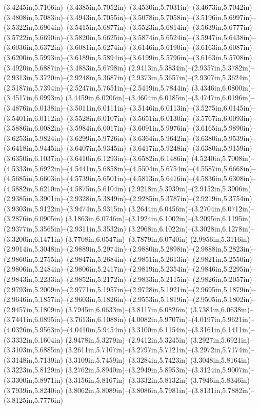 (3.4245in,5.7106in)--(3.4385in,5.7052in)--(3.4530in,5.7031in)--(3.4673in,5.7042in)--(3.4808in,5.7083in)--(3.4943in,5.7055in)--(3.5078in,5.7058in)--(3.5196in,5.6997in)--(3.5322in,5.6964in)--(3.5415in,5.6877in)--(3.5523in,5.6814in)--(3.5639in,5.6777in)--(3.5722in,5.6690in)--(3.5820in,5.6625in)--(3.5874in,5.6524in)--(3.5947in,5.6438in)--(3.6036in,5.6372in)--(3.6081in,5.6274in)--(3.6146in,5.6190in)--(3.6163in,5.6087in)--(3.6200in,5.5993in)--(3.6189in,5.5894in)--(3.6199in,5.5796in)--(3.6163in,5.5708in) (3.4920in,5.6887in)--(3.4883in,5.6798in) (2.9413in,5.3834in)--(2.9357in,5.3782in)--(2.9313in,5.3720in)--(2.9248in,5.3687in) (2.9373in,5.3657in)--(2.9307in,5.3624in) (2.5187in,5.7394in)--(2.5247in,5.7651in)--(2.5419in,5.7844in) (3.4346in,6.0800in)--(3.4517in,6.0993in) (3.4459in,6.0206in)--(3.4604in,6.0185in)--(3.4747in,6.0196in)--(3.4876in,6.0138in)--(3.5011in,6.0111in)--(3.5146in,6.0113in)--(3.5275in,6.0145in)--(3.5401in,6.0112in)--(3.5528in,6.0107in)--(3.5651in,6.0130in)--(3.5767in,6.0093in)--(3.5886in,6.0082in)--(3.5984in,6.0017in)--(3.6091in,5.9976in)--(3.6165in,5.9890in)--(3.6253in,5.9824in)--(3.6299in,5.9726in)--(3.6364in,5.9642in)--(3.6380in,5.9539in)--(3.6418in,5.9445in)--(3.6407in,5.9345in)--(3.6417in,5.9248in)--(3.6380in,5.9159in) (3.6350in,6.1037in)--(3.6410in,6.1293in)--(3.6582in,6.1486in) (4.5240in,5.7008in)--(4.5333in,5.6922in)--(4.5441in,5.6858in)--(4.5504in,5.6754in)--(4.5587in,5.6668in)--(4.5685in,5.6603in)--(4.5739in,5.6501in)--(4.5813in,5.6416in)--(4.5836in,5.6308in)--(4.5882in,5.6210in)--(4.5875in,5.6104in) (2.9218in,5.3939in)--(2.9152in,5.3906in) (2.9385in,5.3901in)--(2.9328in,5.3849in)--(2.9285in,5.3787in)--(2.9219in,5.3754in) (3.9303in,5.9122in)--(3.9474in,5.9315in) (3.2644in,6.0456in)--(3.2704in,6.0712in)--(3.2876in,6.0905in) (3.1863in,6.0746in)--(3.1924in,6.1002in)--(3.2095in,6.1195in) (2.9377in,5.3565in)--(2.9311in,5.3532in) (3.2968in,6.1022in)--(3.3028in,6.1278in)--(3.3200in,6.1471in) (3.7708in,6.0547in)--(3.7879in,6.0740in) (2.9956in,5.3116in)--(2.9914in,5.3048in)--(2.9889in,5.2974in)--(2.9880in,5.2898in)--(2.9888in,5.2823in)--(2.9860in,5.2755in)--(2.9847in,5.2684in)--(2.9851in,5.2613in)--(2.9821in,5.2550in)--(2.9806in,5.2484in)--(2.9806in,5.2417in)--(2.9819in,5.2354in)--(2.9846in,5.2295in)--(2.9843in,5.2233in)--(2.9852in,5.2172in)--(2.9833in,5.2115in)--(2.9826in,5.2057in)--(2.9793in,5.2009in)--(2.9771in,5.1957in)--(2.9728in,5.1921in)--(2.9695in,5.1879in)--(2.9646in,5.1857in)--(2.9603in,5.1826in)--(2.9553in,5.1819in)--(2.9505in,5.1802in)--(2.9457in,5.1809in) (3.7945in,6.0633in)--(3.8117in,6.0826in) (3.7381in,6.0638in)--(3.7441in,6.0895in)--(3.7613in,6.1088in) (4.0082in,5.9707in)--(4.0197in,5.9621in)--(4.0326in,5.9563in)--(4.0410in,5.9454in) (3.3100in,6.1154in)--(3.3161in,6.1411in)--(3.3332in,6.1604in) (2.9478in,5.3279in)--(2.9412in,5.3245in) (3.2927in,5.6921in)--(3.3103in,5.6885in) (3.2611in,5.7107in)--(3.2797in,5.7121in)--(3.2972in,5.7174in)--(3.3148in,5.7139in) (3.3109in,5.7459in)--(3.3284in,5.7423in) (3.3048in,5.8164in)--(3.3223in,5.8129in) (3.2762in,5.8940in)--(3.2949in,5.8953in)--(3.3124in,5.9007in)--(3.3300in,5.8971in) (3.3156in,5.8167in)--(3.3332in,5.8132in) (3.7946in,5.8346in)--(3.7939in,5.8240in) (3.8062in,5.8089in)--(3.8086in,5.7981in)--(3.8131in,5.7882in)--(3.8125in,5.7776in) 